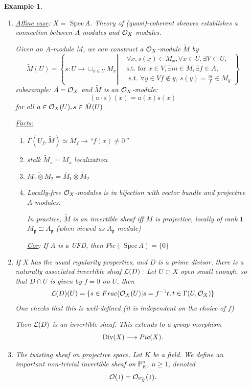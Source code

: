 \documentclass[11pt]{article}
\newtheorem{ex}[thm]{Example}
\newcommand{\spec}{\text{ Spec}\,}
\newcommand{\proj}{\mathbb P}
\newcommand{\scp}{{\mathfrak p}}
\newcommand{\call}{{\cal L}}
\newcommand{\calo}{{\cal O}}
\newcommand{\Div}{\textnormal{Div}}
\newcommand{\lrta}{\longrightarrow}
\begin{document}
\begin{ex}\ 
\begin{enumerate}[label=\boxed{\arabic*}]
\item \underline{Affine case}: $X=\spec A$. Theory of (quasi)-coherent sheaves establishes
 a connection between $A$-modules and $\calo_X$-modules.

Given an $A$-module $M$, we can construct a $\calo_X$-module  $\tilde{M}$ by 
$$
\tilde{M}(U)=\left\{s:U\lrta \sqcup_{x\in U}M_x\left|\begin{aligned}
&\forall x,s(x)\in M_x, \forall x\in U,\exists V\subset U
,\\
&\text{s.t. for } x\in V,\exists m\in M,\exists f\in A,\\ 
&\text{ s.t. } \forall y\in V f\notin y,\  s(y)=\frac{m}{f}\in M_y  
\end{aligned}
\right.\right\}
$$
subexample: $\tilde{A}=\calo_X$ and $\tilde{M}$ is an $\calo_X$-module:
$$
(a\cdot s)(x)=a(x)s(x)
$$
for all $a\in \calo_X(U), s\in \tilde{M}(U)$

\underline{Facts:}

\begin{enumerate}
\item $\Gamma(U_f,\tilde{M})\simeq M_f\lrta $``$f(x)\neq 0$''
\item stalk $\tilde{M}_x= M_x$ localization
\item $\widetilde{M_1\otimes M_2}=\tilde{M_1}\otimes\tilde{M_2}$
\item  [Serre-Swan] Locally-free $\calo_X$-modules is in bijection with vector bundle and  projective $A$-modules.

In practice, $\tilde{M}$ is an invertible sheaf iff $M$ is projective, locally of rank $1$ $M_\scp\cong A_\scp$ (when viewed as $A_\scp$-module)

\underline{Cor}: If $A$ is a UFD, then $Pic(\spec A)=\{0\}$
\end{enumerate}

\item If $X$ has the usual regularity properties, and $D$ is a prime divisor, there is a naturally associated invertible sheaf $\call(D):$ Let $U\subset X$ open small enough, so that $D\cap U$ is given by $f=0$ on $U$, then
$$
\call(D)(U)=\{s\in Frac(\calo_X(U)| s=f^{-1}t, t\in \Gamma(U, \calo_X)\}
$$
 One checks that this is well-defined (it is independent on the choice of $f$)

 Then $\call(D)$ is an invertible sheaf. This extends to a group morphism
 $$
  \Div(X)\lrta Pic(X).
 $$
 \item The twisting sheaf on projective space. Let $K$ be a field. We define an important non-trivial invertible sheaf on $\proj^n_K$, $n\geq 1$, denoted 
 $$
\calo(1)=\calo_{\proj^n_K}(1).
 $$


\end{enumerate}
\end{ex}
\end{document}
